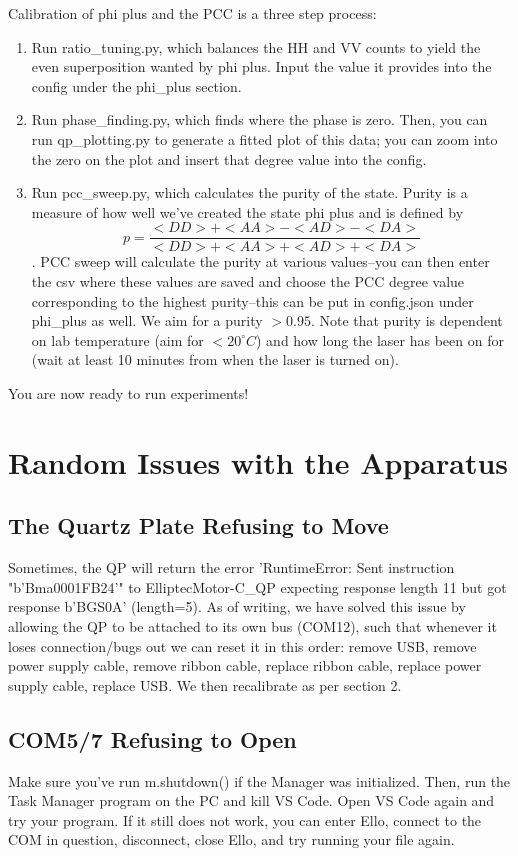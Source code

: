 \documentclass{paper}[11pt]
\begin{document}
Calibration of phi plus and the PCC is a three step process:
\begin{enumerate}
    \item Run ratio\_tuning.py, which balances the HH and VV counts to yield the even superposition wanted by phi plus. Input the value it provides into the config under the phi\_plus section.
    \item Run phase\_finding.py, which finds where the phase is zero. Then, you can run qp\_plotting.py to generate a fitted plot of this data; you can zoom into the zero on the plot and insert that degree value into the config. 
    \item Run pcc\_sweep.py, which calculates the purity of the state. Purity is a measure of how well we've created the state phi plus and is defined by $$p = \frac{<DD> + <AA> - <AD> - <DA>}{<DD> + <AA> + <AD> + <DA>}$$. PCC sweep will calculate the purity at various values--you can then enter the csv where these values are saved and choose the PCC degree value corresponding to the highest purity--this can be put in config.json under phi\_plus as well. We aim for a purity $>0.95$. Note that purity is dependent on lab temperature (aim for $<20^\circ C$) and how long the laser has been on for (wait at least 10 minutes from when the laser is turned on).
\end{enumerate}
You are now ready to run experiments! 

\section{Random Issues with the Apparatus}
\subsection{The Quartz Plate Refusing to Move}
Sometimes, the QP will return the error 'RuntimeError: Sent instruction "b'Bma0001FB24'" to ElliptecMotor-C\_QP expecting response length 11 but got response b'BGS0A' (length=5). As of writing, we have solved this issue by allowing the QP to be attached to its own bus (COM12), such that whenever it loses connection/bugs out we can reset it in this order: remove USB, remove power supply cable, remove ribbon cable, replace ribbon cable, replace power supply cable, replace USB. We then recalibrate as per section 2.
\subsection{COM5/7 Refusing to Open}
Make sure you've run m.shutdown() if the Manager was initialized. Then, run the Task Manager program on the PC and kill VS Code. Open VS Code again and try your program. If it still does not work, you can enter Ello, connect to the COM in question, disconnect, close Ello, and try running your file again. 
\end{document}
